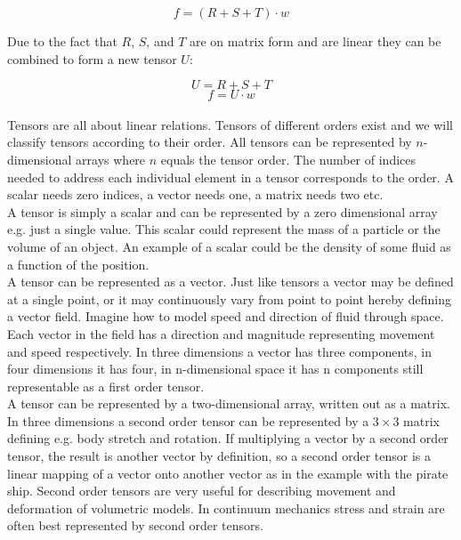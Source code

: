 \begin{equation}
f = (R + S + T) \cdot w
\end{equation}

Due to the fact that $R$, $S$, and $T$ are on matrix form and are
linear they can be combined to form a new tensor $U$:

\begin{equation}
U = R + S + T
\end{equation}  
\begin{equation}
f = U \cdot w
\end{equation} \\

Tensors are all about linear relations. Tensors of different orders
exist and we will classify tensors according to
their order. All tensors can be represented by $n$-dimensional
arrays where $n$ equals the tensor order. The number of indices needed to 
address each individual element in a tensor corresponds to the order. A
scalar needs zero indices, a vector needs one, a matrix needs two
etc. \\

A  tensor is simply a scalar and can be represented by a
zero dimensional array e.g. just a single value. This scalar could
represent the mass of a particle or the volume of an object. An
example of a scalar could be the density of some fluid as a
function of the position. \\

A  tensor can be represented as
a vector. Just like tensors a vector may be
defined at a single point, or it may continuously vary from point to
point hereby defining a vector field. Imagine how to model speed and
direction of fluid through space. Each vector in the field has a
direction and magnitude representing movement and speed
respectively. In three dimensions a vector has three components, in
four dimensions it has four, in n-dimensional space it has n
components still representable as a first order tensor. \\

A  tensor can be represented by a two-dimensional array,
written out as a matrix. In three dimensions a second order tensor
can be represented by a $3 \times 3$ matrix defining e.g. body stretch and
rotation. If multiplying a vector by a second order tensor, the result
is another vector by definition, so a second order tensor is a linear mapping of a
vector onto another vector as in the example with the pirate
ship. Second order tensors are very useful for describing movement and
deformation of volumetric models. In continuum mechanics stress and
strain are often best represented by second order tensors. \\ 

